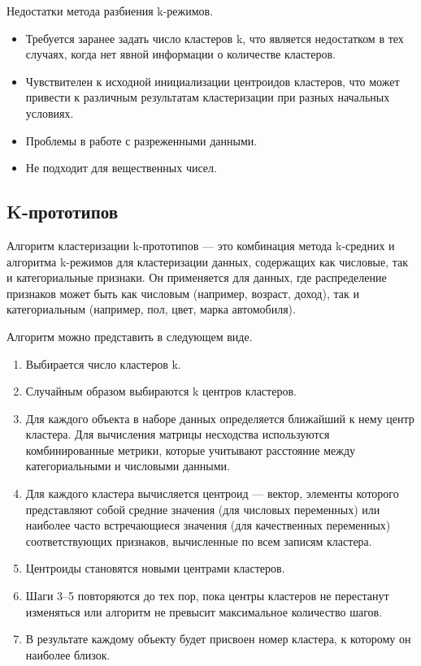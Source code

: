 Недостатки метода разбиения k-режимов.

\begin{itemize}
    \item Требуется заранее задать число кластеров k, что является недостатком в тех случаях, когда нет явной информации о количестве кластеров.
    \item Чувствителен к исходной инициализации центроидов кластеров, что может привести к различным результатам кластеризации при разных начальных условиях.
    \item Проблемы в работе с разреженными данными.
    \item Не подходит для вещественных чисел.
\end{itemize}


\subsection{K-прототипов}


Алгоритм кластеризации k-прототипов \cite{KprototypesСlustering} --- это комбинация метода k-средних и алгоритма k-режимов для кластеризации данных, содержащих как числовые, так и категориальные признаки. Он применяется для данных, где распределение признаков может быть как числовым (например, возраст, доход), так и категориальным (например, пол, цвет, марка автомобиля).

Алгоритм можно представить в следующем виде.

\begin{enumerate}
    \item Выбирается число кластеров k.
    \item Случайным образом выбираются k центров кластеров.
    \item Для каждого объекта в наборе данных определяется ближайший к нему центр кластера. Для вычисления матрицы несходства используются комбинированные метрики, которые учитывают расстояние между категориальными и числовыми данными.
    \item Для каждого кластера вычисляется центроид --- вектор, элементы которого представляют собой средние значения (для числовых переменных) или наиболее часто встречающиеся значения (для качественных переменных) соответствующих признаков, вычисленные по всем записям кластера.
    \item Центроиды становятся новыми центрами кластеров.
    \item Шаги 3--5 повторяются до тех пор, пока центры кластеров не перестанут изменяться или алгоритм не превысит максимальное количество шагов.
    \item В результате каждому объекту будет присвоен номер кластера, к которому он наиболее близок.
\end{enumerate}

